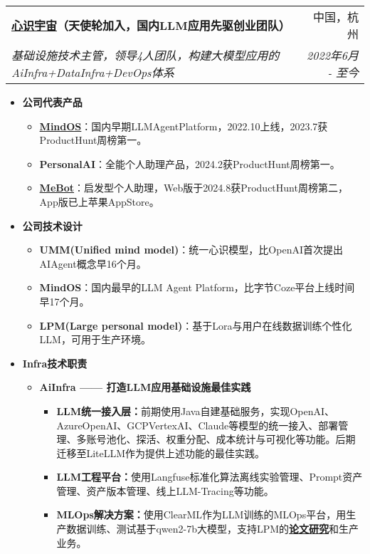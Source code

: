\documentclass[letterpaper,11pt]{article}
\makeatletter
\newcommand{\resumeSubheading}[4]{
	\vspace{-1pt}\item
	\begin{tabular*}{0.97\textwidth}[t]{l@{\extracolsep{\fill}}r}
		\textbf{#1} & #2 \\
		\textit{\small#3} & \textit{\small #4} \\
	\end{tabular*}\vspace{-5pt}
}
\makeatother
\begin{document}
\begin{spacing}{0.9}
		\resumeSubheading
		{\href{https://home.mindos.com}{心识宇宙}（天使轮加入，国内LLM应用先驱创业团队）}{中国，杭州}
		{基础设施技术主管，领导4人团队，构建大模型应用的AiInfra+DataInfra+DevOps体系}{2022年6月 - 至今}
		\begin{itemize}
			\item \textbf{公司代表产品}
			\begin{itemize}
				\item \href{https://mindos.com}{\textbf{MindOS}}：国内早期LLMAgentPlatform，2022.10上线，2023.7获ProductHunt周榜第一。
				\item \textbf{PersonalAI}：全能个人助理产品，2024.2获ProductHunt周榜第一。
				\item \href{https://me.bot}{\textbf{MeBot}}：启发型个人助理，Web版于2024.8获ProductHunt周榜第二，App版已上苹果AppStore。
			\end{itemize}
			\item \textbf{公司技术设计}
			\begin{itemize}
			\item {\textbf{UMM(Unified mind model)}}：统一心识模型，比OpenAI首次提出AIAgent概念早16个月。
			\item {\textbf{MindOS}}：国内最早的LLM Agent Platform，比字节Coze平台上线时间早17个月。
			\item {\textbf{LPM(Large personal model)}}：基于Lora与用户在线数据训练个性化LLM，可用于生产环境。
			\end{itemize}
						
			\item \textbf{Infra技术职责}
			\begin{itemize}
				\item \textbf{AiInfra —— 打造LLM应用基础设施最佳实践}
				\begin{itemize}
					\item \textbf{LLM统一接入层：}前期使用Java自建基础服务，实现OpenAI、AzureOpenAI、GCPVertexAI、Claude等模型的统一接入、部署管理、多账号池化、探活、权重分配、成本统计与可视化等功能。后期迁移至LiteLLM作为提供上述功能的最佳实践。
					\item \textbf{LLM工程平台：}使用Langfuse标准化算法离线实验管理、Prompt资产管理、资产版本管理、线上LLM-Tracing等功能。
					\item \textbf{MLOps解决方案：}使用ClearML作为LLM训练的MLOps平台，用生产数据训练、测试基于qwen2-7b大模型，支持LPM的\href{https://arxiv.org/abs/2406.18312}{\textbf{论文研究}}和生产业务。
				\end{itemize}
				

\end{itemize}
\end{itemize}
\end{spacing}
\end{document}
